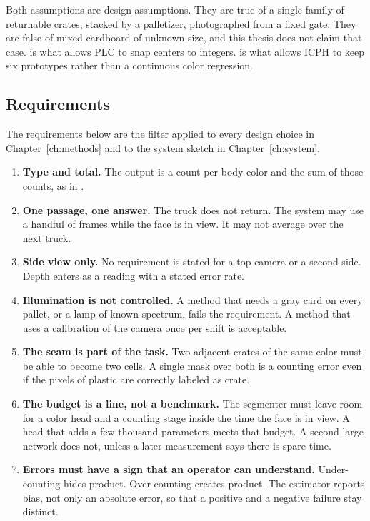 Both assumptions are design assumptions. They are true of a single family of returnable crates, stacked by a palletizer, photographed from a fixed gate. They are false of mixed cardboard of unknown size, and this thesis does not claim that case.  is what allows PLC to snap centers to integers.  is what allows ICPH to keep six prototypes rather than a continuous color regression.

\subsection{Requirements}
\label{sec:requirements}

The requirements below are the filter applied to every design choice in Chapter~\ref{ch:methods} and to the system sketch in Chapter~\ref{ch:system}.

\begin{enumerate}
\item \textbf{Type and total.} The output is a count per body color and the sum of those counts, as in .
\item \textbf{One passage, one answer.} The truck does not return. The system may use a handful of frames while the face is in view. It may not average over the next truck.
\item \textbf{Side view only.} No requirement is stated for a top camera or a second side. Depth enters as a reading with a stated error rate.
\item \textbf{Illumination is not controlled.} A method that needs a gray card on every pallet, or a lamp of known spectrum, fails the requirement. A method that uses a calibration of the camera once per shift is acceptable.
\item \textbf{The seam is part of the task.} Two adjacent crates of the same color must be able to become two cells. A single mask over both is a counting error even if the pixels of plastic are correctly labeled as crate.
\item \textbf{The budget is a line, not a benchmark.} The segmenter must leave room for a color head and a counting stage inside the time the face is in view. A head that adds a few thousand parameters meets that budget. A second large network does not, unless a later measurement says there is spare time.
\item \textbf{Errors must have a sign that an operator can understand.} Under-counting hides product. Over-counting creates product. The estimator reports bias, not only an absolute error, so that a positive and a negative failure stay distinct.
\end{enumerate}

